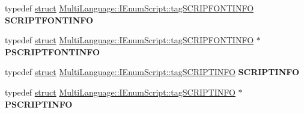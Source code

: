 \begin{DoxyCompactItemize}
\item 
\mbox{\label{interface_multi_language_1_1_i_enum_script_a51b644fef8440b6b73886038a62cb34b}} 
typedef \hyperlink{interfacestruct}{struct} \hyperlink{struct_multi_language_1_1_i_enum_script_1_1tag_s_c_r_i_p_f_o_n_t_i_n_f_o}{Multi\+Language\+::\+I\+Enum\+Script\+::tag\+S\+C\+R\+I\+P\+F\+O\+N\+T\+I\+N\+FO} {\bfseries S\+C\+R\+I\+P\+T\+F\+O\+N\+T\+I\+N\+FO}
\item 
\mbox{\label{interface_multi_language_1_1_i_enum_script_af19485d1b696f5225671416a6a0ac699}} 
typedef \hyperlink{interfacestruct}{struct} \hyperlink{struct_multi_language_1_1_i_enum_script_1_1tag_s_c_r_i_p_f_o_n_t_i_n_f_o}{Multi\+Language\+::\+I\+Enum\+Script\+::tag\+S\+C\+R\+I\+P\+F\+O\+N\+T\+I\+N\+FO} $\ast$ {\bfseries P\+S\+C\+R\+I\+P\+T\+F\+O\+N\+T\+I\+N\+FO}
\item 
\mbox{\label{interface_multi_language_1_1_i_enum_script_a30e43c03ad3c1115a281f57272816a7b}} 
typedef \hyperlink{interfacestruct}{struct} \hyperlink{struct_multi_language_1_1_i_enum_script_1_1tag_s_c_r_i_p_t_i_n_f_o}{Multi\+Language\+::\+I\+Enum\+Script\+::tag\+S\+C\+R\+I\+P\+T\+I\+N\+FO} {\bfseries S\+C\+R\+I\+P\+T\+I\+N\+FO}
\item 
\mbox{\label{interface_multi_language_1_1_i_enum_script_ac2d71ddf26de8e591ba1ec8bc977aae6}} 
typedef \hyperlink{interfacestruct}{struct} \hyperlink{struct_multi_language_1_1_i_enum_script_1_1tag_s_c_r_i_p_t_i_n_f_o}{Multi\+Language\+::\+I\+Enum\+Script\+::tag\+S\+C\+R\+I\+P\+T\+I\+N\+FO} $\ast$ {\bfseries P\+S\+C\+R\+I\+P\+T\+I\+N\+FO}
\end{DoxyCompactItemize}
